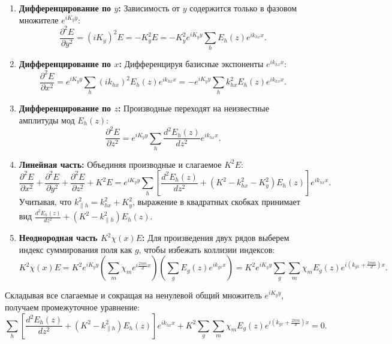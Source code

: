 \documentclass[a4paper,11pt]{article}
\begin{document}
\begin{enumerate}
    \item \textbf{Дифференцирование по $y$:} Зависимость от $y$ содержится только в фазовом множителе $e^{i K_y y}$:
    \begin{equation}
        \frac{\partial^2 E}{\partial y^2} = (i K_y)^2 E = - K_y^2 E = - K_y^2 e^{i K_y y} \sum_h E_h(z) e^{i k_{hx} x}.
    \end{equation}
    \item \textbf{Дифференцирование по $x$:} Дифференцируя базисные экспоненты $e^{i k_{hx} x}$:
    \begin{equation}
        \frac{\partial^2 E}{\partial x^2} = e^{i K_y y} \sum_h (i k_{hx})^2 E_h(z) e^{i k_{hx} x} = - e^{i K_y y} \sum_h k_{hx}^2 E_h(z) e^{i k_{hx} x}.
    \end{equation}
    \item \textbf{Дифференцирование по $z$:} Производные переходят на неизвестные амплитуды мод $E_h(z)$:
    \begin{equation}
        \frac{\partial^2 E}{\partial z^2} = e^{i K_y y} \sum_h \frac{d^2 E_h(z)}{dz^2} e^{i k_{hx} x}.
    \end{equation}
    \item \textbf{Линейная часть:} Объединяя производные и слагаемое $K^2 E$:
    \begin{equation}
        \frac{\partial^2 E}{\partial x^2} + \frac{\partial^2 E}{\partial y^2} + \frac{\partial^2 E}{\partial z^2} + K^2 E = e^{i K_y y} \sum_h \left[ \frac{d^2 E_h(z)}{dz^2} + (K^2 - k_{hx}^2 - K_y^2) E_h(z) \right] e^{i k_{hx} x}.
    \end{equation}
    Учитывая, что $k_{\parallel h}^2 = k_{hx}^2 + K_y^2$, выражение в квадратных скобках принимает вид $\frac{d^2 E_h(z)}{dz^2} + (K^2 - k_{\parallel h}^2) E_h(z)$.
    \item \textbf{Неоднородная часть $K^2 \chi(x) E$:} Для произведения двух рядов выберем индекс суммирования поля как $g$, чтобы избежать коллизии индексов:
    \begin{equation}
        K^2 \chi(x) E = K^2 e^{i K_y y} \left( \sum_m \chi_m e^{i \frac{2\pi m}{d} x} \right) \left( \sum_g E_g(z) e^{i k_{gx} x} \right) = K^2 e^{i K_y y} \sum_g \sum_m \chi_m E_g(z) e^{i \left( k_{gx} + \frac{2\pi m}{d} \right) x}.
    \end{equation}
\end{enumerate}
Складывая все слагаемые и сокращая на ненулевой общий множитель $e^{i K_y y}$, получаем промежуточное уравнение:
\begin{equation}
    \sum_h \left[ \frac{d^2 E_h(z)}{dz^2} + (K^2 - k_{\parallel h}^2) E_h(z) \right] e^{i k_{hx} x} + K^2 \sum_g \sum_m \chi_m E_g(z) e^{i \left( k_{gx} + \frac{2\pi m}{d} \right) x} = 0.
    \label{eq:intermediate_sum}
\end{equation}
\end{document}
